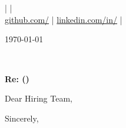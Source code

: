 \documentclass[11pt,a4paper]{article}
\begin{document}
\begin{center}
  {\LARGE\bfseries\color{accent} \cvName}\\[2pt]
  {\color{muted}\cvTitle}\\[3pt]
  \small \cvEmail{} | \cvPhone{} | \cvLocation\\
  \href{https://github.com/\cvGithub}{github.com/\cvGithub} |
  \href{https://linkedin.com/in/\cvLinkedin}{linkedin.com/in/\cvLinkedin} |
  \href{https://\cvPortfolio}{\cvPortfolio}
\end{center}

\vspace{14pt}
\today

\vspace{6pt}
\textbf{\cvCoverCompany}\\
\cvCoverCity

\vspace{6pt}
\textbf{Re: \cvCoverJobTitle{} (\cvCoverRef)}

Dear Hiring Team,

\cvCoverBody

\vspace{10pt}
Sincerely,\\
\cvName
\end{document}
